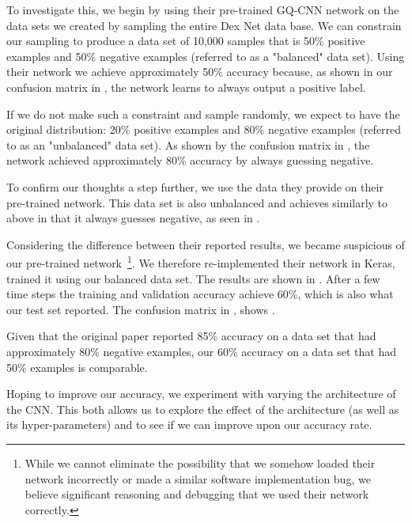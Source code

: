 To investigate this, we begin by using their pre-trained GQ-CNN network  on the data sets we created by sampling the entire Dex Net data base. 
We can constrain our sampling to produce a data set of 10,000 samples that is 50\% positive examples and 50\% negative examples (referred to as a "balanced" data set). 
Using their network we achieve approximately 50\% accuracy because, as shown in our confusion matrix in , the network learns to always output a positive label. 

If we do not make such a constraint and sample randomly, we expect to have the original distribution: 20\% positive examples and 80\% negative examples (referred to as an "unbalanced" data set). 
As shown by the confusion matrix in , the network achieved approximately 80\% accuracy by always guessing negative. 

To confirm our thoughts a step further, we use the data they provide on their pre-trained network. 
This data set is also unbalanced and achieves similarly to above in that it always guesses negative, as seen in . 

Considering the difference between their reported results, we became suspicious of our pre-trained network~\footnote{While we cannot eliminate the possibility that we somehow loaded their network incorrectly or made a similar software implementation bug, we believe significant reasoning and debugging that we used their network correctly.}.
We therefore re-implemented their network in Keras, trained it using our balanced data set. 
The results are shown in . 
After a few time steps the training and validation accuracy achieve 60\%, which is also what our test set reported. 
The confusion matrix in , shows . 

Given that the original paper reported 85\% accuracy on a data set that had approximately 80\% negative examples, our 60\% accuracy on a data set that had 50\% examples is comparable. 

Hoping to improve our accuracy, we experiment with varying the architecture of the CNN. 
This both allows us to explore the effect of the architecture (as well as its hyper-parameters) and to see if we can improve upon our accuracy rate. 

